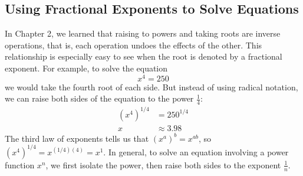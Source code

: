 \documentclass[10pt,]{book}
\theoremstyle{plain}
\theoremstyle{definition}
\theoremstyle{definition}
\theoremstyle{definition}
\theoremstyle{definition}
\theoremstyle{definition}
\numberwithin{equation}{section}
\newcommand{\amp}{ & }
\begin{document}
\subsection[Using Fractional Exponents to Solve Equations]{Using Fractional Exponents to Solve Equations}\label{subsection-71}

    In Chapter 2, we learned that raising to powers and taking roots are inverse operations, that is, each operation undoes the effects of the other. This relationship is especially easy to see when the root is denoted by a fractional exponent. For example, to solve the equation 
    \begin{equation*}x^4 = 250\end{equation*}
    we would take the fourth root of each side. But instead of using radical notation, we can raise both sides of the equation to the power \(\frac{1}{4}\):
    \begin{align*}
    \left(x^4\right)^{1/4} \amp= 250^{1/4} \\
    x \amp \approx 3.98
    \end{align*}
    The third law of exponents tells us that \(\left(x^a\right)^b = x^{ab}\), so \(\left(x^4\right)^{1/4} = x^{(1/4)(4)} = x^1\). In general, to solve an equation involving a power function \(x^n\), we first isolate the power, then raise both sides to the exponent \(\frac{1}{n}\).
%
\end{document}
